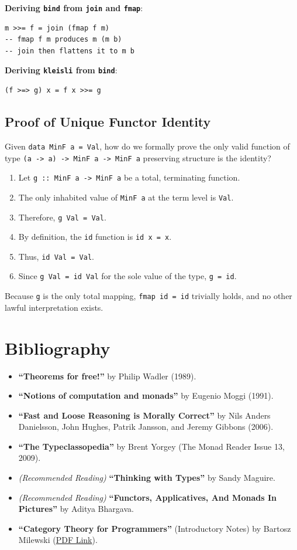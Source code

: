 \documentclass[12pt,a4paper]{article}
\begin{document}
\textbf{Deriving \texttt{bind} from \texttt{join} and \texttt{fmap}}:
\begin{lstlisting}
m >>= f = join (fmap f m)
-- fmap f m produces m (m b)
-- join then flattens it to m b
\end{lstlisting}

\textbf{Deriving \texttt{kleisli} from \texttt{bind}}:
\begin{lstlisting}
(f >=> g) x = f x >>= g
\end{lstlisting}

\subsection{Proof of Unique Functor Identity}
Given \texttt{data MinF a = Val}, how do we formally prove the only valid function of type \texttt{(a -> a) -> MinF a -> MinF a} preserving structure is the identity?

\begin{enumerate}
    \item  Let \texttt{g :: MinF a -> MinF a} be a total, terminating function.
    \item  The only inhabited value of \texttt{MinF a} at the term level is \texttt{Val}.
    \item  Therefore, \texttt{g Val = Val}.
    \item  By definition, the \texttt{id} function is \texttt{id x = x}. 
    \item  Thus, \texttt{id Val = Val}.
    \item  Since \texttt{g Val = id Val} for the sole value of the type, \texttt{g = id}.
\end{enumerate}
Because \texttt{g} is the only total mapping, \texttt{fmap id = id} trivially holds, and no other lawful interpretation exists.

\section{Bibliography}
\begin{itemize}
    \item \textbf{``Theorems for free!''} by Philip Wadler (1989).
    \item \textbf{``Notions of computation and monads''} by Eugenio Moggi (1991).
    \item \textbf{``Fast and Loose Reasoning is Morally Correct''} by Nils Anders Danielsson, John Hughes, Patrik Jansson, and Jeremy Gibbons (2006).
    \item \textbf{``The Typeclassopedia''} by Brent Yorgey (The Monad Reader Issue 13, 2009).
    \item \textit{(Recommended Reading)} \textbf{``Thinking with Types''} by Sandy Maguire.
    \item \textit{(Recommended Reading)} \textbf{``Functors, Applicatives, And Monads In Pictures''} by Aditya Bhargava.
    \item \textbf{``Category Theory for Programmers''} (Introductory Notes) by Bartosz Milewski (\href{https://ai.dmi.unibas.ch/research/reading_group/milewski-2023-01-30.pdf}{PDF Link}).
\end{itemize}
\end{document}
